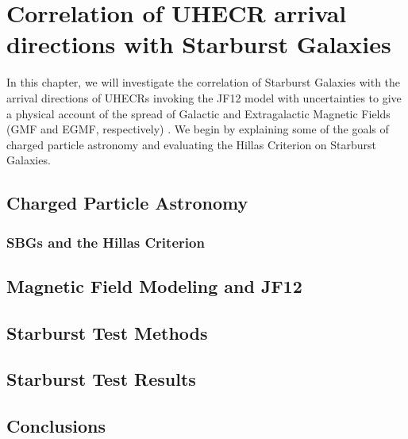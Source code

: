 
\chapter{Correlation of UHECR arrival directions with Starburst Galaxies}
In this chapter, we will investigate the correlation of Starburst Galaxies with the arrival directions of UHECRs invoking the JF12 model with uncertainties to give a physical account of the spread of Galactic and Extragalactic Magnetic Fields (GMF and EGMF, respectively) \cite{jf12,sean}. We begin by explaining some of the goals of charged particle astronomy and evaluating the Hillas Criterion on Starburst Galaxies.
\section{Charged Particle Astronomy}
\subsection{SBGs and the Hillas Criterion} %
\section{Magnetic Field Modeling and JF12}
\section{Starburst Test Methods}
\section{Starburst Test Results}
\section{Conclusions}
